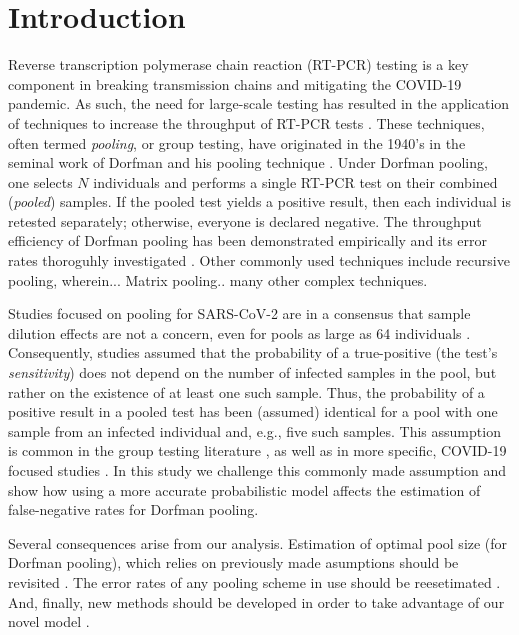 \documentclass{article}
\begin{document}
\section*{Introduction}
Reverse transcription polymerase chain reaction (RT-PCR) testing is a
key component in breaking transmission chains and mitigating the
COVID-19 pandemic. As such, the need for large-scale testing has
resulted in the application of techniques to increase the throughput
of RT-PCR tests \cite{DorfmanYuvalDor, PoolSize30, BayesianDorfman,
  MatrixPooling, LionDorfman}. These techniques, often termed
\emph{pooling}, or group testing, have originated in the 1940's in the
seminal work of Dorfman and his pooling technique
\cite{DorfmanOriginal, DorfmanYuvalDor}. Under Dorfman pooling, one
selects $N$ individuals and performs a single RT-PCR test on their
combined (\emph{pooled}) samples. If the pooled test yields a positive
result, then each individual is retested separately; otherwise,
everyone is declared negative. The throughput efficiency of Dorfman
pooling has been demonstrated empirically \cite{DorfmanYuvalDor} and
its error rates thoroguhly investigated \cite{Kim, Simplistic1,
  OptimalDorfmanPool}. Other commonly used techniques include
recursive pooling, wherein... Matrix pooling.. many other complex
techniques.

Studies focused on pooling for SARS-CoV-2 are in a consensus that
sample dilution effects \cite{DilutionHIV, GroupDilution} are not a
concern, even for pools as large as 64 individuals \cite{PoolSize30,
  Lion, DorfmanYuvalDor, DilutionCOVID}. Consequently, studies assumed
that the probability of a true-positive (the test's
\emph{sensitivity}) does not depend on the number of infected samples
in the pool, but rather on the existence of at least one such
sample. Thus, the probability of a positive result in a pooled test
has been (assumed) identical for a pool with one sample from an
infected individual and, e.g., five such samples. This assumption is
common in the group testing literature \cite{Kim, OptimalDorfmanPool},
as well as in more specific, COVID-19 focused studies
\cite{Simplistic1, Simplistic2}. In this study we challenge this
commonly made assumption and show how using a more accurate
probabilistic model affects the estimation of false-negative
rates for Dorfman pooling.

Several consequences arise from our analysis. Estimation of optimal
pool size (for Dorfman pooling), which relies on previously made
asumptions should be revisited \cite{OptimalDorfmanPool}. The error
rates of any pooling scheme in use should be reesetimated
\cite{BayesianDorfman, Kim}. And, finally, new methods should be
developed in order to take advantage of our novel model \cite{DOPE}.
\end{document}
